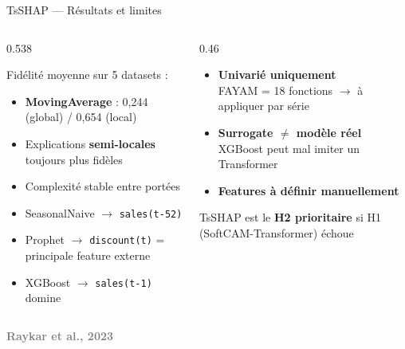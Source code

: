 \documentclass[10pt]{beamer}
\newcommand{\source}[1]{\vspace{6pt}\hfill{\textcolor{gray}{\textbf{\tiny #1}}}}
\begin{document}
\begin{frame}{TsSHAP --- Résultats et limites}
  \begin{columns}
    \begin{column}{0.538\textwidth}
      \begin{tcolorbox}[
        colback=blue!3, colframe=blue!40!black,
        arc=2mm, boxrule=0.5pt, fonttitle=\bfseries,
        title={Résultats (Fidélité --- Table 6)}]
        Fidélité moyenne sur 5 datasets :
        \begin{itemize}
          \item \textbf{MovingAverage} : 0,244 (global) / 0,654 (local)
          \item Explications \textbf{semi-locales} toujours plus fidèles
          \item Complexité stable entre portées
        \end{itemize}
      \end{tcolorbox}
      \begin{tcolorbox}[
        colback=orange!3, colframe=orange!50!black,
        arc=2mm, boxrule=0.5pt, fonttitle=\bfseries,
        title={Illustration (jeans-sales-weekly)}]
        \begin{itemize}
          \item SeasonalNaive $\to$ \texttt{sales(t-52)}
          \item Prophet $\to$ \texttt{discount(t)} = principale feature externe
          \item XGBoost $\to$ \texttt{sales(t-1)} domine
        \end{itemize}
      \end{tcolorbox}
    \end{column}
    \begin{column}{0.46\textwidth}
      \begin{tcolorbox}[
        colback=red!3, colframe=red!60!black,
        arc=2mm, boxrule=0.5pt, fonttitle=\bfseries,
        title={Limites}]
        \begin{itemize}
          \item \textbf{Univarié uniquement}\\
                FAYAM = 18 fonctions $\to$ à appliquer par série
          \item \textbf{Surrogate $\neq$ modèle réel}\\
                XGBoost peut mal imiter un Transformer
          \item \textbf{Features à définir manuellement}
        \end{itemize}
      \end{tcolorbox}
      \begin{tcolorbox}[
        colback=green!3, colframe=green!40!black,
        arc=2mm, boxrule=0.5pt, fonttitle=\bfseries,
        title={Pour notre projet}]
        TsSHAP est le \textbf{H2 prioritaire} si H1 (SoftCAM-Transformer) échoue
      \end{tcolorbox}
    \end{column}
  \end{columns}
  \source{Raykar et al., 2023}
\end{frame}
\end{document}
